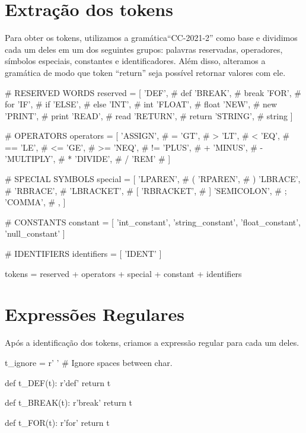 \documentclass[
	12pt,				%
	openright,			%
	twoside,			%
	a4paper,			%
	english,			%
	french,				%
	spanish,			%
	brazil				%
	]{abntex2}
\begin{document}
\section{Extração dos tokens}
	Para obter os tokens, utilizamos a gramática``CC-2021-2'' como base
    e dividimos cada um deles em um dos seguintes grupos: palavras reservadas,
	operadores, símbolos especiais, constantes e identificadores. Além disso,
	alteramos a gramática de modo que token ``return'' seja possível retornar valores com ele.

\begin{python}
# RESERVED WORDS
reserved = [
    'DEF',         # def
    'BREAK',       # break
    'FOR',         # for
    'IF',          # if
    'ELSE',        # else
    'INT',         # int
    'FLOAT',       # float
    'NEW',         # new
    'PRINT',       # print
    'READ',        # read
    'RETURN',      # return
    'STRING',      # string
] 
\end{python}

\begin{python}
# OPERATORS
operators = [
    'ASSIGN',      # =
    'GT',          # >
    'LT',          # <
    'EQ',          # ==
    'LE',          # <=
    'GE',          # >=
    'NEQ',         # !=
    'PLUS',        # +
    'MINUS',       # -
    'MULTIPLY',    # *
    'DIVIDE',      # / 
    'REM'          # %
]
\end{python}
\newpage

\begin{python}
# SPECIAL SYMBOLS
special = [
    'LPAREN',      # (
    'RPAREN',      # )
    'LBRACE',      # {
    'RBRACE',      # }
    'LBRACKET',    # [
    'RBRACKET',    # ]
    'SEMICOLON',   # ;
    'COMMA',       # ,
]
\end{python}

\begin{python}
# CONSTANTS
constant = [
    'int_constant',
    'string_constant',
    'float_constant',
    'null_constant'
]
\end{python}

\begin{python}
# IDENTIFIERS
identifiers = [
    'IDENT'
]
\end{python}

\begin{python}
tokens = reserved + operators + special + constant + identifiers
\end{python}
\section{Expressões Regulares}
Após a identificação dos tokens, criamos a expressão regular para cada um deles.
\begin{python}
t_ignore = r' ' # Ignore spaces between char.

def t_DEF(t):
    r'def'
    return t

def t_BREAK(t):
    r'break'
    return t

def t_FOR(t):
    r'for'
    return t
\end{python}
\end{document}
